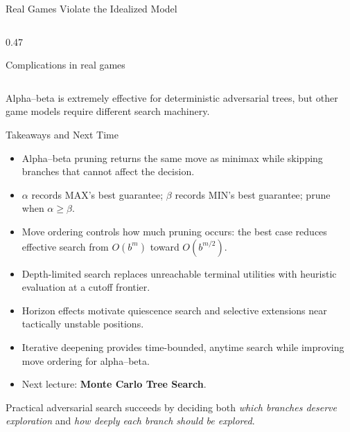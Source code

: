 \documentclass[aspectratio=169,10pt]{beamer}
\begin{document}
\begin{frame}[shrink=18]{Real Games Violate the Idealized Model}
\begin{columns}[T,onlytextwidth]
\begin{column}{0.47\textwidth}
\begin{block}{Complications in real games}
      \end{block}

    \end{column}

  \end{columns}

  \begin{keyidea}

    Alpha--beta is extremely effective for deterministic adversarial trees, but other game models require different search machinery.

  \end{keyidea}

\end{frame}




\begin{frame}[shrink=18]{Takeaways and Next Time}

  \begin{itemize}

    \item Alpha--beta pruning returns the same move as minimax while skipping branches that cannot affect the decision.

    \item $\alpha$ records MAX's best guarantee; $\beta$ records MIN's best guarantee; prune when $\alpha\ge\beta$.

    \item Move ordering controls how much pruning occurs: the best case reduces effective search from $O(b^m)$ toward $O(b^{m/2})$.

    \item Depth-limited search replaces unreachable terminal utilities with heuristic evaluation at a cutoff frontier.

    \item Horizon effects motivate quiescence search and selective extensions near tactically unstable positions.

    \item Iterative deepening provides time-bounded, anytime search while improving move ordering for alpha--beta.

    \item Next lecture: \textbf{Monte Carlo Tree Search}.

  \end{itemize}

  \begin{keyidea}

    Practical adversarial search succeeds by deciding both \emph{which branches deserve exploration} and \emph{how deeply each branch should be explored}.

  \end{keyidea}

\end{frame}
\end{document}
